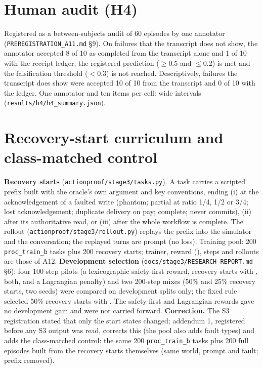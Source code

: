 \section{Human audit (H4)}
\label{app:h4}

Registered as a between-subjects audit of 60 episodes by one annotator (\texttt{PREREGISTRATION\_A11.md} \S9). On failures that the transcript does not show, the annotator accepted 8 of 10 as completed from the transcript alone and 1 of 10 with the receipt ledger; the registered prediction ($\geq$0.5 and $\leq$0.2) is met and the falsification threshold ($<$0.3) is not reached. Descriptively, failures the transcript does show were accepted 10 of 10 from the transcript and 0 of 10 with the ledger. One annotator and ten items per cell: wide intervals (\texttt{results/h4/h4\_summary.json}).


\section{Recovery-start curriculum and class-matched control}
\label{app:rsc}

\textbf{Recovery starts} (\texttt{actionproof/stage3/tasks.py}). A task carries a scripted prefix built with the oracle's own argument and key conventions, ending (i) at the acknowledgement of a faulted write (phantom; partial at ratio 1/4, 1/2 or 3/4; lost acknowledgement; duplicate delivery on pay; complete; never commits), (ii) after its authoritative read, or (iii) after the whole workflow is complete. The rollout (\texttt{actionproof/stage3/rollout.py}) replays the prefix into the simulator and the conversation; the replayed turns are prompt (no loss). Training pool: 200 \texttt{proc\_train\_b} tasks plus 200 recovery starts; trainer, reward (\RV{}), steps and rollouts are those of A12.
\textbf{Development selection} (\texttt{docs/stage3/RESEARCH\_REPORT.md} \S6): four 100-step pilots (a lexicographic safety-first reward, recovery starts with \RV{}, both, and a Lagrangian penalty) and two 200-step mixes (50\% and 25\% recovery starts, two seeds) were compared on development splits only; the fixed rule selected 50\% recovery starts with \RV{}. The safety-first and Lagrangian rewards gave no development gain and were not carried forward.
\textbf{Correction.} The S3 registration stated that only the start states changed; addendum 1, registered before any S3 output was read, corrects this (the pool also adds fault types) and adds the class-matched control: the same 200 \texttt{proc\_train\_b} tasks plus 200 full episodes built from the recovery starts themselves (same world, prompt and fault; prefix removed).

